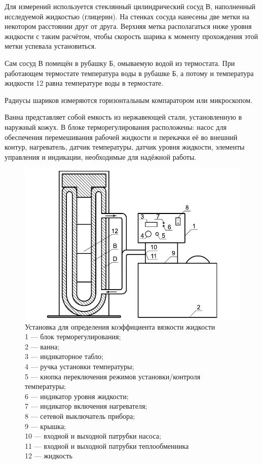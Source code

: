 \documentclass[a4paper,12pt]{article}
\begin{document}
Для измерений используется
стеклянный цилиндрический сосуд В, наполненный исследуемой жидкостью (глицерин). На стенках сосуда нанесены две метки на некотором расстоянии друг от друга. Верхняя метка располагаться ниже уровня жидкости с таким расчётом, чтобы скорость
шарика к моменту прохождения этой метки успевала установиться.

Сам сосуд В помещён в рубашку Б, омываемую водой из термостата.
При работающем термостате температура воды в рубашке Б, а потому и температура жидкости 12 равна температуре воды в термостате.

Радиусы шариков измеряются горизонтальным компаратором
или микроскопом.

Ванна представляет собой емкость из нержавеющей стали, установленную в наружный кожух.
В блоке терморегулирования расположены: насос для обеспечения перемешивания рабочей жидкости и перекачки её во внешний
контур, нагреватель, датчик температуры, датчик уровня жидкости,
элементы управления и индикации, необходимые для надёжной работы.

\begin{figure}[h!]
	\centering
	\includegraphics[width=0.8\linewidth]{ust}
	\caption{Установка для определения коэффициента вязкости жидкости\\
	1 --- блок терморегулирования;\\
	2 --- ванна;\\
	3 --- индикаторное табло;\\
	4 --- ручка установки температуры;\\
	5 --- кнопка переключения режимов установки/контроля температуры;\\
	6 --- индикатор уровня жидкости;\\
	7 --- индикатор включения нагревателя;\\
	8 --- сетевой выключатель прибора;\\
	9 --- крышка;\\
	10 --- входной и выходной патрубки насоса;\\
	11 --- входной и выходной патрубки теплообменника\\
	12 --- жидкость
	}
	\label{fig:ust}
\end{figure}
\end{document}
